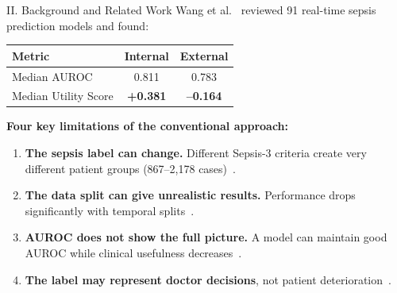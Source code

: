 \documentclass[aspectratio=169,10pt]{beamer}
\newcommand{\tablestyle}{%
  \renewcommand{\arraystretch}{1.2}%
  \small%
}
\begin{document}
\begin{frame}{II. Background and Related Work}
Wang et al.~\cite{wang2025srpm} reviewed 91 real-time sepsis prediction models and found:

\vspace{3pt}
\begin{center}
\tablestyle
\begin{tabular}{lcc}
\toprule
\textbf{Metric} & \textbf{Internal} & \textbf{External} \\
\midrule
Median AUROC         & 0.811      & 0.783 \\
Median Utility Score & \textbf{+0.381} & \textbf{--0.164} \\
\bottomrule
\end{tabular}
\end{center}

\vspace{4pt}
\textbf{Four key limitations of the conventional approach:}
\begin{enumerate}
  \item \textbf{The sepsis label can change.} Different Sepsis-3 criteria create very different patient groups (867--2,178 cases)~\cite{cohen2024subtle}.
  \item \textbf{The data split can give unrealistic results.} Performance drops significantly with temporal splits~\cite{guo2022temporal}.
  \item \textbf{AUROC does not show the full picture.} A model can maintain good AUROC while clinical usefulness decreases~\cite{wang2025srpm}.
  \item \textbf{The label may represent doctor decisions}, not patient deterioration~\cite{kamran2024evaluation}.
\end{enumerate}
\end{frame}
\end{document}
